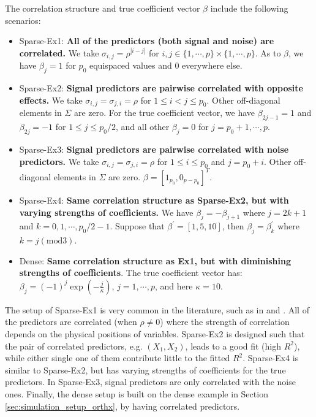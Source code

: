The correlation structure and true coefficient vector $\beta$ include the following scenarios:
\begin{itemize}
	\item Sparse-Ex1: \textbf{All of the predictors (both signal and noise) are correlated.} We take $\sigma_{i,j}=\rho^{|i-j|}$ for $i,j\in\{1,\cdots,p\}\times\{1,\cdots,p\}$. As to $\beta$, we have $\beta_j=1$ for $p_0$ equispaced values and $0$ everywhere else. 
	\item Sparse-Ex2: \textbf{Signal predictors are pairwise correlated with opposite effects.} We take $\sigma_{i,j}=\sigma_{j,i}=\rho$ for $1\le i <j \le p_0$. Other off-diagonal elements in $\Sigma$ are zero. For the true coefficient vector, we have $\beta_{2j-1}=1$ and $\beta_{2j}=-1$ for $1\le j \le p_0/2$, and all other $\beta_j=0$ for $j=p_0+1,\cdots,p$.
	\item Sparse-Ex3: \textbf{Signal predictors are pairwise correlated with noise predictors.} We take $\sigma_{i,j}=\sigma_{j,i}=\rho$ for $1\le i \le p_0$ and $j=p_0+i$. Other off-diagonal elements in $\Sigma$ are zero. $\beta=[1_{p_0},0_{p-p_0}]^T$.
	\item Sparse-Ex4: \textbf{Same correlation structure as Sparse-Ex2, but with varying strengths of coefficients.} We have $\beta_j=-\beta_{j+1}$ where $j=2k+1$ and $k=0,1,\cdots,p_0/2-1$. Suppose that $\beta^\prime=[1,5,10]$, then $\beta_j=\beta^\prime_k$ where $k=j (\text{mod} 3)$. 
	\item Dense: \textbf{Same correlation structure as Ex1, but with diminishing strengths of coefficients}. The true coefficient vector has: $\beta_j = \displaystyle (-1)^j \exp(-\frac{j}{\kappa})$, $j=1,\cdots,p$, and here $\kappa=10$.
\end{itemize}
The setup of Sparse-Ex1 is very common in the literature, such as in \citet{Bertsimas2016} and \citet{Hastie2017}. All of the predictors are correlated (when $\rho \ne 0$) where the strength of correlation depends on the physical positions of variables. Sparse-Ex2 is designed such that the pair of correlated predictors, e.g. $(X_1,X_2)$, leads to a good fit (high $R^2$), while either single one of them contribute little to the fitted $R^2$. Sparse-Ex4 is similar to Sparse-Ex2, but has varying strengths of coefficients for the true predictors. In Sparse-Ex3, signal predictors are only correlated with the noise ones. Finally, the dense setup is built on the dense example in Section \ref{sec:simulation_setup_orthx}, by having correlated predictors.

